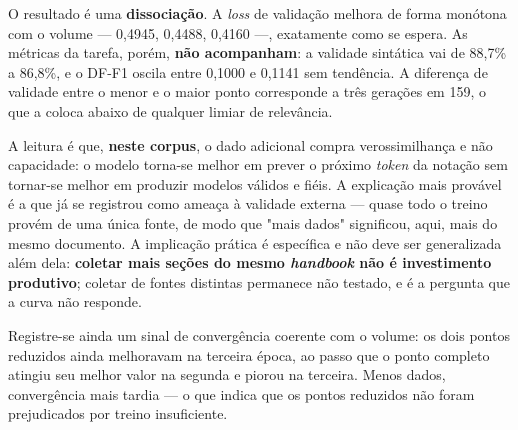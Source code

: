 \begin{table}[h!]
\end{table}

O resultado é uma \textbf{dissociação}. A \textit{loss} de validação melhora de forma monótona com o volume --- 0,4945, 0,4488, 0,4160 ---, exatamente como se espera. As métricas da tarefa, porém, \textbf{não acompanham}: a validade sintática vai de 88,7\% a 86,8\%, e o DF-F1 oscila entre 0,1000 e 0,1141 sem tendência. A diferença de validade entre o menor e o maior ponto corresponde a três gerações em 159, o que a coloca abaixo de qualquer limiar de relevância.

A leitura é que, \textbf{neste corpus}, o dado adicional compra verossimilhança e não capacidade: o modelo torna-se melhor em prever o próximo \textit{token} da notação sem tornar-se melhor em produzir modelos válidos e fiéis. A explicação mais provável é a que já se registrou como ameaça à validade externa --- quase todo o treino provém de uma única fonte, de modo que "mais dados" significou, aqui, mais do mesmo documento. A implicação prática é específica e não deve ser generalizada além dela: \textbf{coletar mais seções do mesmo \textit{handbook} não é investimento produtivo}; coletar de fontes distintas permanece não testado, e é a pergunta que a curva não responde.

Registre-se ainda um sinal de convergência coerente com o volume: os dois pontos reduzidos ainda melhoravam na terceira época, ao passo que o ponto completo atingiu seu melhor valor na segunda e piorou na terceira. Menos dados, convergência mais tardia --- o que indica que os pontos reduzidos não foram prejudicados por treino insuficiente.

